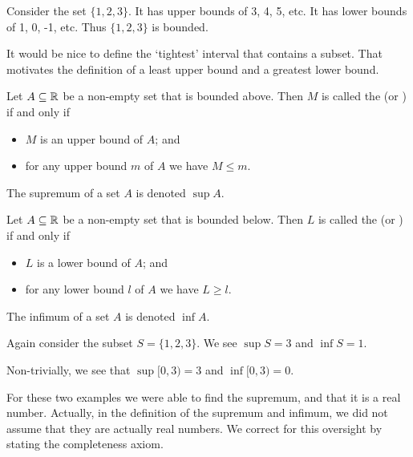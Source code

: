 \begin{example}
    Consider the set $\{1, 2, 3\}$. It has upper bounds of 3, 4, 5, etc. It has lower bounds of 1, 0, -1, etc. Thus $\{1, 2, 3\}$ is bounded.
\end{example}

It would be nice to define the `tightest' interval that contains a subset. That motivates the definition of a least upper bound and a greatest lower bound.

\begin{definition}
    Let $A\subseteq \mathbb{R}$ be a non-empty set that is bounded above. Then $M$ is called the  (or ) if and only if
    \begin{itemize}
        \item $M$ is an upper bound of $A$; and
        \item for any upper bound $m$ of $A$ we have $M \leq m$.
    \end{itemize}
    The supremum of a set $A$ is denoted $\sup A$.
\end{definition}

\begin{definition}
    Let $A\subseteq \mathbb{R}$ be a non-empty set that is bounded below. Then $L$ is called the  (or ) if and only if
    \begin{itemize}
        \item $L$ is a lower bound of $A$; and
        \item for any lower bound $l$ of $A$ we have $L \geq l$.
    \end{itemize}
    The infimum of a set $A$ is denoted $\inf A$.
\end{definition}

\begin{example}
    Again consider the subset $S = \{1, 2, 3\}$. We see $\sup S = 3$ and $\inf S = 1$.
\end{example}

\begin{example}
    Non-trivially, we see that $\sup [0, 3) = 3$ and $\inf [0, 3) = 0$.
\end{example}

For these two examples we were able to find the supremum, and that it is a real number. Actually, in the definition of the supremum and infimum, we did not assume that they are actually real numbers. We correct for this oversight by stating the completeness axiom.

